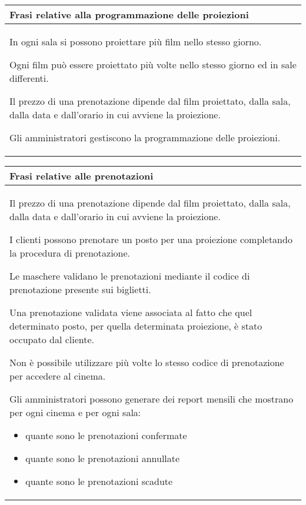 \begin{tabularx}{\linewidth}{|X|}
      \hline
      \rowcolor{tblhdrcolor}
      \textbf{Frasi relative alla programmazione delle proiezioni} \\\hline

      In ogni sala si possono proiettare più film nello stesso giorno.

      Ogni film può essere proiettato più volte nello stesso giorno ed in sale
      differenti.

      Il prezzo di una prenotazione dipende dal film proiettato, dalla
      sala, dalla data e dall'orario in cui avviene la proiezione.

      Gli amministratori gestiscono la programmazione delle proiezioni.
      \\ \hline
\end{tabularx}

\begin{tabularx}{\linewidth}{|X|}
      \hline
      \rowcolor{tblhdrcolor}
      \textbf{Frasi relative alle prenotazioni} \\\hline
      Il prezzo di una prenotazione dipende dal film proiettato, dalla
      sala, dalla data e dall'orario in cui avviene la proiezione.

      I clienti possono prenotare un posto per una proiezione
      completando la procedura di prenotazione.

      Le maschere validano le prenotazioni mediante il codice
      di prenotazione presente sui biglietti.

      Una prenotazione validata viene associata al fatto che quel
      determinato posto, per quella determinata proiezione,
      è stato occupato dal cliente.

      Non è possibile utilizzare più volte lo stesso codice di
      prenotazione per accedere al cinema.

      Gli amministratori possono generare dei report mensili che
      mostrano per ogni cinema e per ogni sala:
      \begin{itemize}
            \item quante sono le prenotazioni confermate
            \item quante sono le prenotazioni annullate
            \item quante sono le prenotazioni scadute
      \end{itemize}
      \\ \hline
\end{tabularx}

